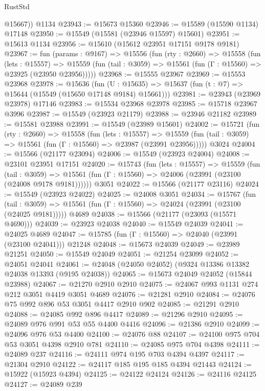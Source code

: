 \begin{lexlean}{RustStd}
\begin{coremodule}
        @15667))
    @1134
@23943 := @15673 @15360
@23946 := @15589 (@15590 @1134) @17148
@23950 := @15549 (@15581 (@23946 @15597) @15601)
@23951 := @15613 @1134
@23956 := @15610 (@15612 @23951 @17151 @9178 @9181)
@23967 := fun (params : @9167) =>
  @15556
    (fun (rty : @2660) =>
    @15558
      (fun (lets : @15557) =>
      @15559 (fun (tail : @3059) => @15561 (fun (Γ : @15560) => @23925 (@23950 @23956)))))
@23968 := @15555 @23967
@23969 := @15553 @23968
@23978 := @15636
    (fun (U : @15635) => @15637 (fun (t : @7) => @15644 (@15549 (@15650 @17148 @9184) @15661)))
@23981 := @23943 (@23969 @23978) @17146
@23983 := @15534 @23968 @23978
@23985 := @15718 @23967 @3996
@23987 := @15549 (@23923 @21179)
@23988 := @23946 @21182
@23989 := @15581 @23988
@23991 := @15549 (@23989 @15601)
@24002 := @15721
    (fun (rty : @2660) =>
    @15558
      (fun (lets : @15557) =>
      @15559 (fun (tail : @3059) => @15561 (fun (Γ : @15560) => @23987 (@23991 @23956)))))
    @3024
@24004 := @15566 (@21177 @23094)
@24006 := @15549 (@23923 @24004)
@24008 := @23101 @23951 @17151
@24020 := @15743
    (fun (lets : @15557) =>
    @15559
      (fun (tail : @3059) =>
      @15561 (fun (Γ : @15560) => @24006 (@23991 (@23100 (@24008 @9178 @9181))))))
    @3051
@24022 := @15566 (@21177 @23116)
@24024 := @15549 (@23923 @24022)
@24025 := @24008 @3051
@24034 := @15767
    (fun (tail : @3059) => @15561 (fun (Γ : @15560) => @24024 (@23991 (@23100 (@24025 @9181)))))
    @4689
@24038 := @15566 (@21177 (@23093 (@15571 @4690)))
@24039 := @23923 @24038
@24040 := @15549 @24039
@24041 := @24025 @4689
@24047 := @15785 (fun (Γ : @15560) => @24040 (@23991 (@23100 @24041))) @21248
@24048 := @15673 @24039
@24049 := @23989 @21251
@24050 := @15549 @24049
@24051 := @21254 @23099
@24052 := @24051 @24041
@24061 := @24048 (@24050 @24052) (@9324 @13386 @13382 @24038 @13393 (@9195 @24038))
@24065 := @15673 @24049 @24052 (@15844 @23988)
@24067 := @21270 @2910 @2910
@24075 := @24067 @993 @1131 @274 @212 @3051 @4419 @3051 @4689
@24076 := @21281 @2910
@24084 := @24076 @75 @992 @896 @53 @3051 @4417 @2910 @902
@24085 := @21291 @2910
@24088 := @24085 @992 @896 @4417
@24089 := @21296 @2910
@24095 := @24089 @976 @991 @53 @55 @4400 @4416
@24096 := @21386 @2910
@24099 := @24096 @976 @53 @4400
@24100 := @24076 @88
@24107 := @24100 @975 @704 @53 @3051 @4398 @2910 @781
@24110 := @24085 @975 @704 @4398
@24111 := @24089 @237
@24116 := @24111 @974 @195 @703 @4394 @4397
@24117 := @21304 @2910
@24122 := @24117 @185 @195 @185 @4394 @21443
@24124 := @15922 (@15923 @4394)
@24125 := @24122 @24124
@24126 := @24116 @24125
@24127 := @24089 @239

\end{coremodule}
\end{lexlean}

